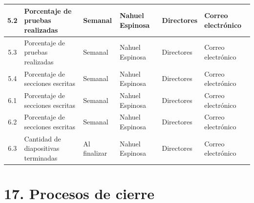 \documentclass[11pt]{charter}
\begin{document}
\begin{table}[!htpb]
\begin{tabularx}{\linewidth}{@{}|c|m{3.5cm}|X|X|X|X|@{}}
 5.2  & Porcentaje de pruebas realizadas                 & Semanal      & Nahuel Espinosa & Directores & Correo electrónico \\ \hline
 5.3  & Porcentaje de pruebas realizadas                 & Semanal      & Nahuel Espinosa & Directores & Correo electrónico \\ \hline
 5.4  & Porcentaje de secciones escritas                 & Semanal      & Nahuel Espinosa & Directores & Correo electrónico \\ \hline
 6.1  & Porcentaje de secciones escritas                 & Semanal      & Nahuel Espinosa & Directores & Correo electrónico \\ \hline
 6.2  & Porcentaje de secciones escritas                 & Semanal      & Nahuel Espinosa & Directores & Correo electrónico \\ \hline
 6.3  & Cantidad de diapositivas terminadas              & Al finalizar & Nahuel Espinosa & Directores & Correo electrónico \\ \hline
\end{tabularx}%
\end{table}

\newpage

\section{17. Procesos de cierre}    
\label{sec:cierre}
\end{document}
